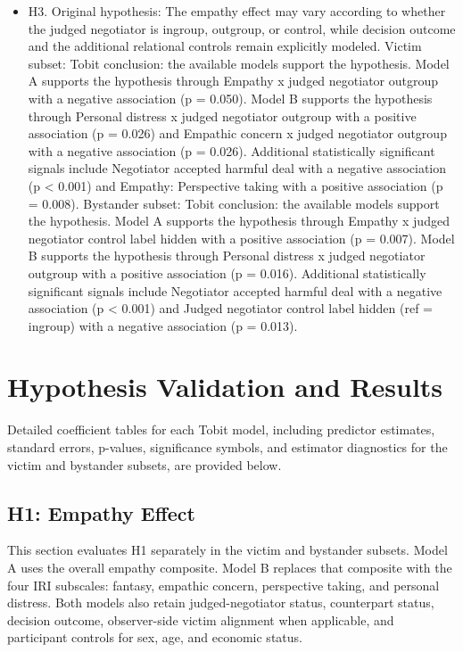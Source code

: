 \documentclass[11pt]{article}
\begin{document}
\begin{itemize}
\item H3. Original hypothesis: The empathy effect may vary according to whether the judged negotiator is ingroup, outgroup, or control, while decision outcome and the additional relational controls remain explicitly modeled. Victim subset: Tobit conclusion: the available models support the hypothesis. Model A supports the hypothesis through Empathy x judged negotiator outgroup with a negative association (p = 0.050). Model B supports the hypothesis through Personal distress x judged negotiator outgroup with a positive association (p = 0.026) and Empathic concern x judged negotiator outgroup with a negative association (p = 0.026). Additional statistically significant signals include Negotiator accepted harmful deal with a negative association (p < 0.001) and Empathy: Perspective taking with a positive association (p = 0.008). Bystander subset: Tobit conclusion: the available models support the hypothesis. Model A supports the hypothesis through Empathy x judged negotiator control label hidden with a positive association (p = 0.007). Model B supports the hypothesis through Personal distress x judged negotiator outgroup with a positive association (p = 0.016). Additional statistically significant signals include Negotiator accepted harmful deal with a negative association (p < 0.001) and Judged negotiator control label hidden (ref = ingroup) with a negative association (p = 0.013).
\end{itemize}

\section{Hypothesis Validation and Results}
Detailed coefficient tables for each Tobit model, including predictor estimates, standard errors, p-values, significance symbols, and estimator diagnostics for the victim and bystander subsets, are provided below.

\subsection{H1: Empathy Effect}
This section evaluates H1 separately in the victim and bystander subsets. Model A uses the overall empathy composite. Model B replaces that composite with the four IRI subscales: fantasy, empathic concern, perspective taking, and personal distress. Both models also retain judged-negotiator status, counterpart status, decision outcome, observer-side victim alignment when applicable, and participant controls for sex, age, and economic status.
\end{document}

